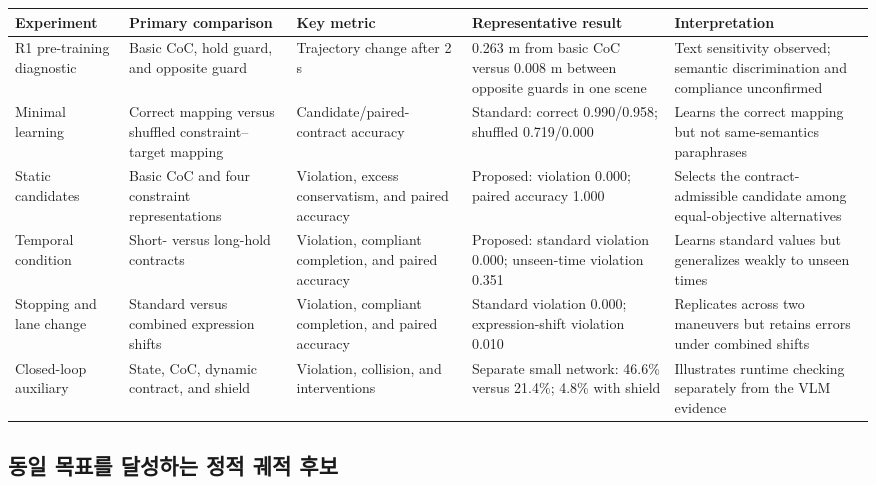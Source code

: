 \begin{table}[!t]
\centering
{}
\label{tab:suite}
\scriptsize
\begin{tabularx}{\textwidth}{L{0.14\textwidth}L{0.19\textwidth}L{0.20\textwidth}L{0.20\textwidth}Y}
\toprule
Experiment & Primary comparison & Key metric & Representative result & Interpretation \\
\midrule
R1 pre-training diagnostic & Basic CoC, hold guard, and opposite guard & Trajectory change after 2 s & 0.263 m from basic CoC versus 0.008 m between opposite guards in one scene & Text sensitivity observed; semantic discrimination and compliance unconfirmed \\
Minimal learning & Correct mapping versus shuffled constraint--target mapping & Candidate/paired-contract accuracy & Standard: correct 0.990/0.958; shuffled 0.719/0.000 & Learns the correct mapping but not same-semantics paraphrases \\
Static candidates & Basic CoC and four constraint representations & Violation, excess conservatism, and paired accuracy & Proposed: violation 0.000; paired accuracy 1.000 & Selects the contract-admissible candidate among equal-objective alternatives \\
Temporal condition & Short- versus long-hold contracts & Violation, compliant completion, and paired accuracy & Proposed: standard violation 0.000; unseen-time violation 0.351 & Learns standard values but generalizes weakly to unseen times \\
Stopping and lane change & Standard versus combined expression shifts & Violation, compliant completion, and paired accuracy & Standard violation 0.000; expression-shift violation 0.010 & Replicates across two maneuvers but retains errors under combined shifts \\
Closed-loop auxiliary & State, CoC, dynamic contract, and shield & Violation, collision, and interventions & Separate small network: 46.6\% versus 21.4\%; 4.8\% with shield & Illustrates runtime checking separately from the VLM evidence \\
\bottomrule
\end{tabularx}
\end{table}

\subsection{동일 목표를 달성하는 정적 궤적 후보}

